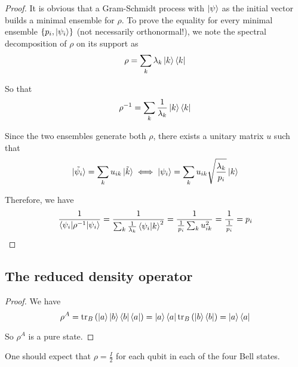 \documentclass[../main.tex]{subfiles}
\begin{document}
\bigskip
\begin{exercise}
\end{exercise}
\begin{proof}
    It is obvious that a Gram-Schmidt process with $\ket{\psi}$ as the initial vector builds a minimal ensemble for $\rho$. To prove the equality for every minimal ensemble $\{p_i,\ket{\psi_i}\}$ (not necessarily orthonormal!), we note the spectral decomposition of $\rho$ on its support as
    \begin{equation*}
        \rho=\sum_k \lambda_k\ket{k}\bra{k}
    \end{equation*}
    
    So that
    \begin{equation*}
        \rho^{-1}=\sum_k\frac{1}{\lambda_k}\ket{k}\bra{k}
    \end{equation*}
    
    Since the two ensembles generate both $\rho$, there exists a unitary matrix $u$ such that
    \begin{equation*}
        \ket{\tilde{\psi_i}}=\sum_k u_{i k}\ket{\tilde{k}}\iff \ket{\psi_i}=\sum_k u_{i k}\sqrt{\frac{\lambda_k}{p_i}}\ket{k}
    \end{equation*}
    
    Therefore, we have
    \begin{equation*}
        \frac{1}{\braket{\psi_i\vert\rho^{-1}\vert\psi_i}}
        = \frac{1}{\sum_k\frac{1}{\lambda_k}\braket{\psi_i\vert k}^2}=\frac{1}{\frac{1}{p_i} \sum_k u_{i k}^2}=\frac{1}{\frac{1}{p_i}}=p_i
    \end{equation*}
\end{proof}

\subsection{The reduced density operator}
\begin{exercise}
\end{exercise}
\begin{proof}
    We have
    \begin{equation*}
        \rho^A = \mathrm{tr}_B\left(\ket{a}\ket{b}\bra{b}\bra{a}\right) = \ket{a}\bra{a}\mathrm{tr}_B\left(\ket{b}\bra{b}\right) = \ket{a}\bra{a}
    \end{equation*}
    
    So $\rho^A$ is a pure state.
\end{proof}

\bigskip
\begin{exercise}
\end{exercise}
One should expect that $\rho=\frac{I}{2}$ for each qubit in each of the four Bell states.
\end{document}
